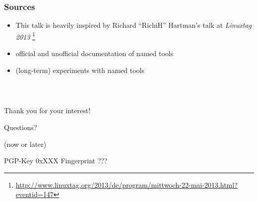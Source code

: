 \documentclass[english,hyperref={pdfpagelabels=false},aspectratio=169]{beamer}
\begin{document}
\begin{frame}
  \frametitle{Sources}
  \begin{itemize}
    \item This talk is heavily inspired by Richard ``RichiH'' Hartman's talk at \textit{Linuxtag 2013}
      \footnote{\tiny\url{http://www.linuxtag.org/2013/de/program/mittwoch-22-mai-2013.html?eventid=147}}
    \item official and unofficial documentation of named tools
    \item (long-term) experiments with named tools
  \end{itemize}
\end{frame}

\begin{frame}
  \frametitle{~}
  \begin{center}
    {\huge Thank you for your interest!}\par
    \bigskip
    \bigskip
    \bigskip
    {\Large Questions?}\par
    {\scriptsize\color{fzjgray50}(now or later)}\par
    \bigskip
    \bigskip
    {\tiny PGP-Key 0x{\color{red}XXX} \hspace{2em} Fingerprint {\color{red}???}}
  \end{center}
\end{frame}
\end{document}
